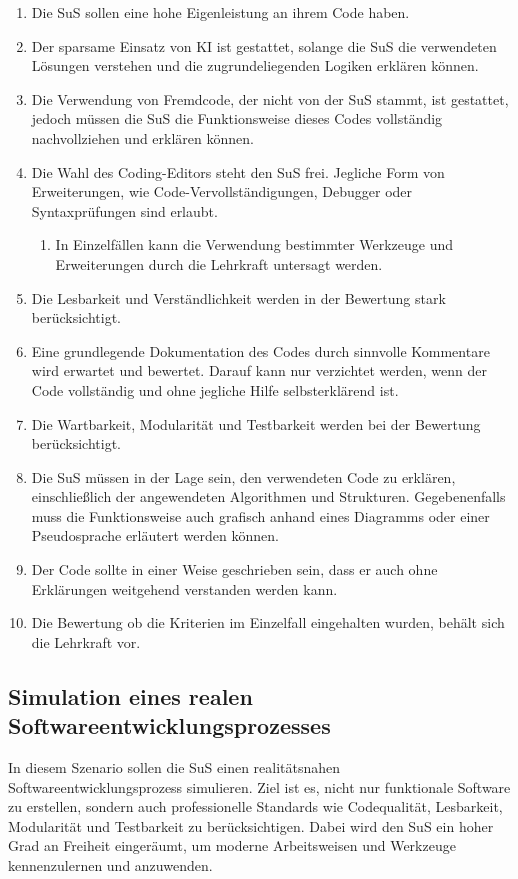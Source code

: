 \documentclass[a4paper,12pt]{article}
\begin{document}
\begin{enumerate}[label=\S\ \arabic*]
    \item Die SuS sollen eine hohe Eigenleistung an ihrem Code haben.
    \item Der sparsame Einsatz von KI ist gestattet, solange die SuS die verwendeten Lösungen verstehen und die zugrundeliegenden Logiken erklären können.
    \item Die Verwendung von Fremdcode, der nicht von der SuS stammt, ist gestattet, jedoch müssen die SuS die Funktionsweise dieses Codes vollständig nachvollziehen und erklären können.
    \item Die Wahl des Coding-Editors steht den SuS frei. Jegliche Form von Erweiterungen, wie Code-Vervollständigungen, Debugger oder Syntaxprüfungen sind erlaubt.
    \begin{enumerate}[label=\S\ \arabic*\alph*]
        \item In Einzelfällen kann die Verwendung bestimmter Werkzeuge und Erweiterungen durch die Lehrkraft untersagt werden.
    \end{enumerate}
    \item Die Lesbarkeit und Verständlichkeit werden in der Bewertung stark berücksichtigt.
    \item Eine grundlegende Dokumentation des Codes durch sinnvolle Kommentare wird erwartet und bewertet. Darauf kann nur verzichtet werden, wenn der Code vollständig und ohne jegliche Hilfe selbsterklärend ist.
    \item Die Wartbarkeit, Modularität und Testbarkeit werden bei der Bewertung berücksichtigt.
    \item Die SuS müssen in der Lage sein, den verwendeten Code zu erklären, einschließlich der angewendeten Algorithmen und Strukturen. Gegebenenfalls muss die Funktionsweise auch grafisch anhand eines Diagramms oder einer Pseudosprache erläutert werden können.
    \item Der Code sollte in einer Weise geschrieben sein, dass er auch ohne Erklärungen weitgehend verstanden werden kann.
    \item Die Bewertung ob die Kriterien im Einzelfall eingehalten wurden, behält sich die Lehrkraft vor.
\end{enumerate}


\subsection{Simulation eines realen Softwareentwicklungsprozesses}
In diesem Szenario sollen die SuS einen realitätsnahen Softwareentwicklungsprozess simulieren. Ziel ist es, nicht nur funktionale Software zu erstellen, sondern auch professionelle Standards wie Codequalität, Lesbarkeit, Modularität und Testbarkeit zu berücksichtigen. Dabei wird den SuS ein hoher Grad an Freiheit eingeräumt, um moderne Arbeitsweisen und Werkzeuge kennenzulernen und anzuwenden.
\end{document}

